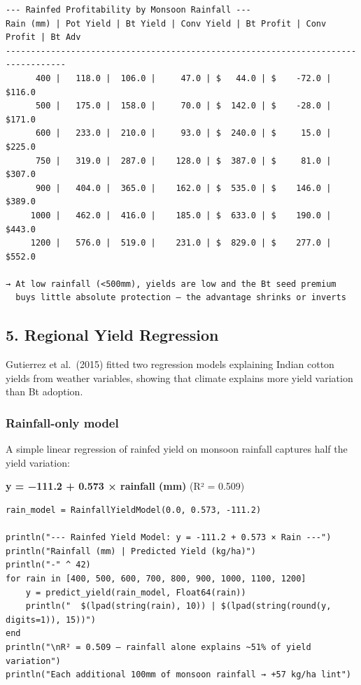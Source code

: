 \begin{verbatim}
--- Rainfed Profitability by Monsoon Rainfall ---
Rain (mm) | Pot Yield | Bt Yield | Conv Yield | Bt Profit | Conv Profit | Bt Adv
----------------------------------------------------------------------------------
      400 |   118.0 |  106.0 |     47.0 | $   44.0 | $    -72.0 | $116.0
      500 |   175.0 |  158.0 |     70.0 | $  142.0 | $    -28.0 | $171.0
      600 |   233.0 |  210.0 |     93.0 | $  240.0 | $     15.0 | $225.0
      750 |   319.0 |  287.0 |    128.0 | $  387.0 | $     81.0 | $307.0
      900 |   404.0 |  365.0 |    162.0 | $  535.0 | $    146.0 | $389.0
     1000 |   462.0 |  416.0 |    185.0 | $  633.0 | $    190.0 | $443.0
     1200 |   576.0 |  519.0 |    231.0 | $  829.0 | $    277.0 | $552.0

→ At low rainfall (<500mm), yields are low and the Bt seed premium
  buys little absolute protection — the advantage shrinks or inverts
\end{verbatim}



\subsection{5. Regional Yield Regression}



\label{16232715998788724859}{}


Gutierrez et al.~(2015) fitted two regression models explaining Indian cotton yields from weather variables, showing that climate explains more yield variation than Bt adoption.



\subsubsection{Rainfall-only model}



\label{7958805999280999798}{}


A simple linear regression of rainfed yield on monsoon rainfall captures half the yield variation:



\textbf{y = −111.2 + 0.573 × rainfall (mm)} (R² = 0.509)




\begin{verbatim}
rain_model = RainfallYieldModel(0.0, 0.573, -111.2)

println("--- Rainfed Yield Model: y = -111.2 + 0.573 × Rain ---")
println("Rainfall (mm) | Predicted Yield (kg/ha)")
println("-" ^ 42)
for rain in [400, 500, 600, 700, 800, 900, 1000, 1100, 1200]
    y = predict_yield(rain_model, Float64(rain))
    println("  $(lpad(string(rain), 10)) | $(lpad(string(round(y, digits=1)), 15))")
end
println("\nR² = 0.509 — rainfall alone explains ~51% of yield variation")
println("Each additional 100mm of monsoon rainfall → +57 kg/ha lint")
\end{verbatim}





